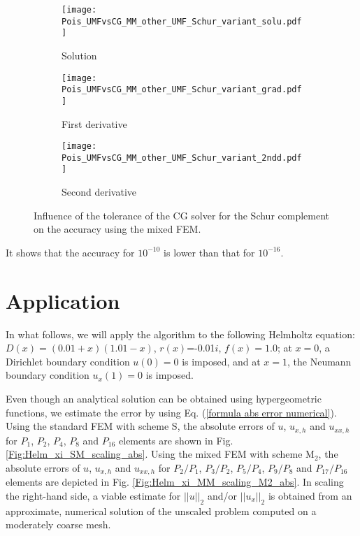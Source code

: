 \documentclass[final,3p]{elsarticle}
\begin{document}
\begin{figure}[!ht]
    \begin{subfigure}{5.5cm}
        \texttt{[image: Pois\_UMFvsCG\_MM\_other\_UMF\_Schur\_variant\_solu.pdf]}
        \caption{Solution}
        \label{Fig:Pois_UMFvsCG_MM_other_UMF_Schur_variant_solu}
    \end{subfigure}
    \begin{subfigure}{5.5cm}
        \texttt{[image: Pois\_UMFvsCG\_MM\_other\_UMF\_Schur\_variant\_grad.pdf]}
        \caption{First derivative}
        \label{Fig:Pois_UMFvsCG_MM_other_UMF_Schur_variant_grad}
    \end{subfigure}
    \begin{subfigure}{5.5cm}
        \texttt{[image: Pois\_UMFvsCG\_MM\_other\_UMF\_Schur\_variant\_2ndd.pdf]}
        \caption{Second derivative}
        \label{Fig:Pois_UMFvsCG_MM_other_UMF_Schur_variant_2ndd}
    \end{subfigure}
\caption{Influence of the tolerance of the CG solver for the Schur complement on the accuracy using the mixed FEM.}
\label{Fig:Pois_UMFvsCG_MM_other_UMF_Schur_variant}
\end{figure}

It shows that the accuracy for $10^{-10}$ is lower than that for $10^{-16}$.

\newpage

\section{Application}		\label{application section}

In what follows, we will apply the algorithm to the following Helmholtz equation: $D(x)=(0.01+x)(1.01-x)$, $r(x)$=-0.01$i$, $f(x)=1.0$;
at $x=0$, a Dirichlet boundary condition $u(0)=0$ is imposed, and at $x=1$, the Neumann boundary condition $u_x(1)=0$ is imposed.


Even though an analytical solution can be obtained using hypergeometric functions, we estimate the error by using Eq. (\ref{formula abs error numerical}).
Using the standard FEM with scheme S, the absolute errors of $u$, $u_{x,h}$ and $u_{xx,h}$ for $P_1$, $P_2$, $P_4$, $P_8$ and $P_{16}$ elements are shown in Fig. \ref{Fig:Helm_xi_SM_scaling_abs}. Using the mixed FEM with scheme $\text{M}_2$, the absolute errors of $u$, $u_{x,h}$ and $u_{xx,h}$ for $P_2/P_1$, $P_3/P_2$, $P_5/P_4$, $P_9/P_8$ and $P_{17}/P_{16}$ elements are depicted in Fig. \ref{Fig:Helm_xi_MM_scaling_M2_abs}. In scaling the right-hand side, a viable estimate for $||u||_{2}$ and/or $||u_x||_{2}$ is obtained from an approximate, numerical solution of the unscaled problem computed on a moderately coarse mesh.
\end{document}
